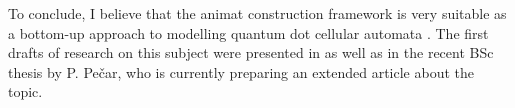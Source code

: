 To conclude, I believe that the animat construction framework is very suitable as a bottom-up approach to modelling quantum dot cellular automata \cite{walus:2004}. The first drafts of research on this subject were presented in \cite{mraz:2004} as well as in the recent BSc thesis by P. Pečar, who is currently preparing an extended article about the topic.
